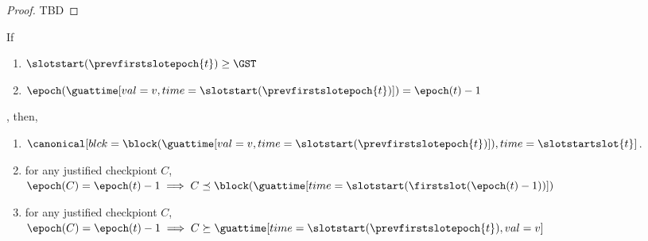 \documentclass{article}
\begin{document}
\begin{proof}
    TBD
\end{proof}

\begin{lemma}\label{lem:gu-e-1-canonical}
    If
    \begin{enumerate}
        \item $\slotstart(\prevfirstslotepoch{t})\geq \GST$
        \item $\epoch(\guattime[val=v,time=\slotstart(\prevfirstslotepoch{t})]) = \epoch(t)-1$
    \end{enumerate},
    then,
    \begin{enumerate}
        \item $\canonical[blck={\block(\guattime[val=v,time=\slotstart(\prevfirstslotepoch{t})])},time=\slotstartslot{t}]$.
        \item for any justified checkpiont $C$, $\epoch(C) = \epoch(t)-1 \implies C  \preceq \block(\guattime[time=\slotstart(\firstslot(\epoch(t)-1))])$
        \item   for any justified checkpiont $C$, $\epoch(C) =\epoch(t)-1 \implies C  \succeq \guattime[time=\slotstart(\prevfirstslotepoch{t}),val=v]$
    \end{enumerate}
\end{lemma}
\end{document}
